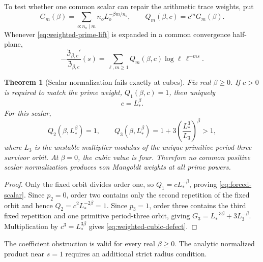 \documentclass[11pt]{article}
\numberwithin{equation}{section}
\newtheorem{theorem}{Theorem}[section]
\theoremstyle{remark}
\begin{document}
To test whether one common scalar can repair the arithmetic trace weights,
put
\begin{equation}
 G_m(\beta)=\sum_{o:n_o\mid m}
 n_oL_o^{-\beta m/n_o},
 \qquad
 Q_m(\beta,c)=c^mG_m(\beta).
 \label{eq:weighted-ledger}
\end{equation}
Whenever \eqref{eq:weighted-prime-lift} is expanded in a common convergence
half-plane,
\begin{equation}
 -\frac{\mathfrak Z_{\beta,c}'}{\mathfrak Z_{\beta,c}}(s)
 =\sum_{\ell,m\ge1}Q_m(\beta,c)
 \log\ell\,\ell^{-ms}.
 \label{eq:weighted-trace-ledger}
\end{equation}

\begin{theorem}[Scalar normalization fails exactly at cubes]
\label{thm:scalar-obstruction}
Fix real \(\beta\ge0\).  If \(c>0\) is required to match the prime weight,
\(Q_1(\beta,c)=1\), then uniquely
\begin{equation}
 c=L_*^\beta.
 \label{eq:forced-scalar}
\end{equation}
For this scalar,
\begin{equation}
 Q_2(\beta,L_*^\beta)=1,
 \qquad
 Q_3(\beta,L_*^\beta)
 =1+3\left(\frac{L_*^3}{L_3}\right)^\beta>1,
 \label{eq:weighted-cubic-defect}
\end{equation}
where \(L_3\) is the unstable multiplier modulus of the unique primitive
period-three survivor orbit.  At \(\beta=0\), the cubic value is four.
Therefore no common positive scalar normalization produces von Mangoldt
weights at all prime powers.
\end{theorem}

\begin{proof}
Only the fixed orbit divides order one, so
\(
Q_1=cL_*^{-\beta}
\), proving \eqref{eq:forced-scalar}.  Since \(p_2=0\), order two contains
only the second repetition of the fixed orbit and hence
\(
Q_2=c^2L_*^{-2\beta}=1
\).  Since \(p_3=1\), order three contains the third fixed repetition and
one primitive period-three orbit, giving
\(
G_3=L_*^{-3\beta}+3L_3^{-\beta}
\).  Multiplication by \(c^3=L_*^{3\beta}\) gives
\eqref{eq:weighted-cubic-defect}.
\end{proof}

The coefficient obstruction is valid for every real \(\beta\ge0\).  The
analytic normalized product near \(s=1\) requires an additional strict
radius condition.
\end{document}
